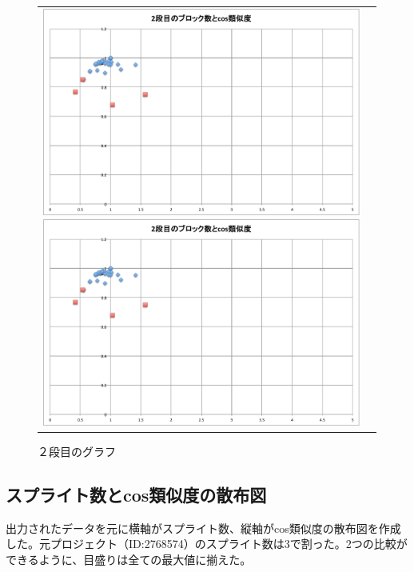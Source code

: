 \documentclass[a4paper,10pt,onecolumn,oneside,openany]{jsbook}
\begin{document}
\begin{figure}[h]
\begin{tabular}{cc}
\begin{minipage}[t]{0.45\hsize}
	 \centering
	 \includegraphics[keepaspectratio, scale = 0.26]{mazegame_second_block.pdf}
	 \includegraphics[keepaspectratio, scale = 0.25]{mazegame_second_block.pdf}
	 \caption{２段目のグラフ}
	 \label{mazegame_second_block_cos}
	\end{minipage}
 \end{tabular}
 \end{figure}

\newpage
\subsection{スプライト数とcos類似度の散布図}
 出力されたデータを元に横軸がスプライト数、縦軸がcos類似度の散布図を作成した。元プロジェクト（ID:2768574）のスプライト数は3で割った。2つの比較ができるように、目盛りは全ての最大値に揃えた。
\end{document}
